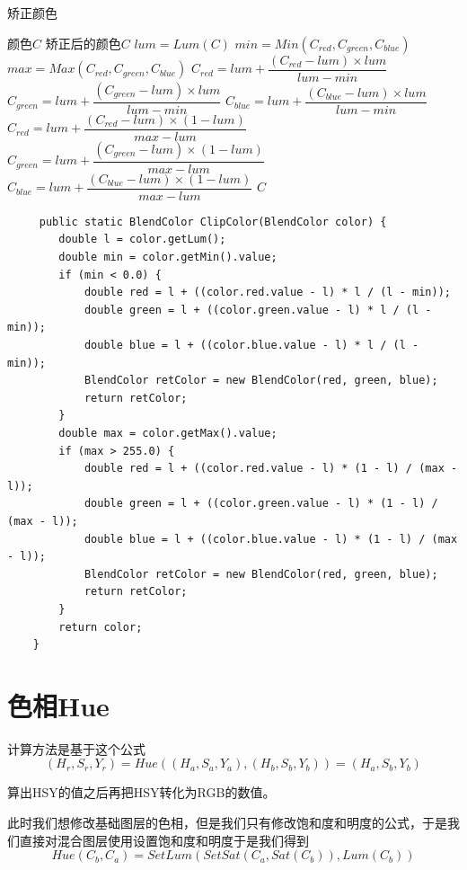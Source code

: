 \begin{algorithm}
	\caption{矫正颜色}
	\begin{algorithmic}[1] %
		\Require  颜色$C$
		\Ensure 矫正后的颜色$C$
		\State $lum= Lum(C)$
		\State $min = Min(C_{red},C_{green},C_{blue})$ 
		\State$max = Max(C_{red},C_{green},C_{blue})$
		\State$C_{red}=lum+\dfrac{(C_{red}-lum)\times lum}{lum-min}$
		\State$C_{green}=lum+\dfrac{(C_{green}-lum)\times lum}{lum-min}$
		\State$C_{blue}=lum+\dfrac{(C_{blue}-lum)\times lum}{lum-min}$
		\EndIf
		\State$C_{red}=lum+\dfrac{(C_{red}-lum)\times (1-lum)}{max-lum}$
		\State$C_{green}=lum+\dfrac{(C_{green}-lum)\times  (1-lum)}{max-lum}$
		\State$C_{blue}=lum+\dfrac{(C_{blue}-lum)\times  (1-lum)}{max-lum}$
		\EndIf
		\State \Return $C$
		\EndFunction
	\end{algorithmic}
\end{algorithm}
\begin{lstlisting}
	 public static BlendColor ClipColor(BlendColor color) {
		double l = color.getLum();
		double min = color.getMin().value;
		if (min < 0.0) {
			double red = l + ((color.red.value - l) * l / (l - min));
			double green = l + ((color.green.value - l) * l / (l - min));
			double blue = l + ((color.blue.value - l) * l / (l - min));
			BlendColor retColor = new BlendColor(red, green, blue);
			return retColor;
		}
		double max = color.getMax().value;
		if (max > 255.0) {
			double red = l + ((color.red.value - l) * (1 - l) / (max - l));
			double green = l + ((color.green.value - l) * (1 - l) / (max - l));
			double blue = l + ((color.blue.value - l) * (1 - l) / (max - l));
			BlendColor retColor = new BlendColor(red, green, blue);
			return retColor;
		}
		return color;
	}
\end{lstlisting}
\newpage
\section{ 色相Hue}


计算方法是基于这个公式
\begin{equation}(H_r,S_r,Y_r)=Hue((H_a,S_a,Y_a),(H_b,S_b,Y_b))=(H_a,S_b,Y_b)\end{equation}

算出HSY的值之后再把HSY转化为RGB的数值。

此时我们想修改基础图层的色相，但是我们只有修改饱和度和明度的公式，于是我们直接对混合图层使用设置饱和度和明度于是我们得到
\begin{equation}Hue(C_b,C_a)=SetLum(SetSat(C_a,Sat(C_b)),Lum(C_b))\end{equation}

